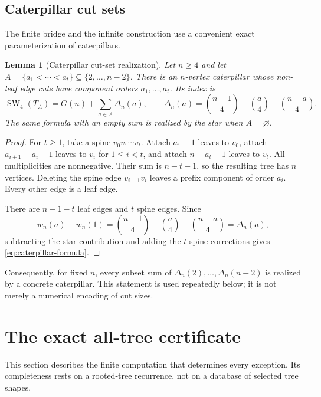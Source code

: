 \documentclass[11pt]{article}
\newtheorem{lemma}[theorem]{Lemma}
\theoremstyle{definition}
\theoremstyle{remark}
\newcommand{\SW}{\operatorname{SW}_4}
\newcommand{\C}[2]{\binom{#1}{#2}}
\begin{document}
\subsection{Caterpillar cut sets}

The finite bridge and the infinite construction use a convenient exact
parameterization of caterpillars.

\begin{lemma}[Caterpillar cut-set realization]\label{lem:caterpillar-realization}
Let $n\ge4$ and let
$A=\{a_1<\cdots<a_t\}\subseteq\{2,\ldots,n-2\}$.  There is an $n$-vertex
caterpillar whose non-leaf edge cuts have component orders
$a_1,\ldots,a_t$.  Its index is
\begin{equation}\label{eq:caterpillar-formula}
  \SW(T_A)=G(n)+\sum_{a\in A}\Delta_n(a),
  \qquad
  \Delta_n(a)=\C{n-1}{4}-\C{a}{4}-\C{n-a}{4}.
\end{equation}
The same formula with an empty sum is realized by the star when $A=\varnothing$.
\end{lemma}

\begin{proof}
For $t\ge1$, take a spine $v_0v_1\cdots v_t$.  Attach $a_1-1$ leaves to
$v_0$, attach $a_{i+1}-a_i-1$ leaves to $v_i$ for
$1\le i<t$, and attach $n-a_t-1$ leaves to $v_t$.  All multiplicities are
nonnegative.  Their sum is $n-t-1$, so the resulting tree has $n$ vertices.
Deleting the spine edge $v_{i-1}v_i$ leaves a prefix component of order
$a_i$.  Every other edge is a leaf edge.

There are $n-1-t$ leaf edges and $t$ spine edges.  Since
\[
  w_n(a)-w_n(1)
  =\C{n-1}{4}-\C{a}{4}-\C{n-a}{4}
  =\Delta_n(a),
\]
subtracting the star contribution and adding the $t$ spine corrections gives
\eqref{eq:caterpillar-formula}.
\end{proof}

Consequently, for fixed $n$, every subset sum of
$\Delta_n(2),\ldots,\Delta_n(n-2)$ is realized by a concrete caterpillar.
This statement is used repeatedly below; it is not merely a numerical encoding
of cut sizes.

\section{The exact all-tree certificate}

This section describes the finite computation that determines every exception.
Its completeness rests on a rooted-tree recurrence, not on a database of
selected tree shapes.
\end{document}

